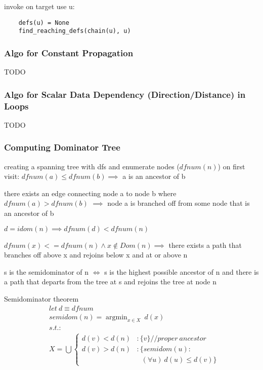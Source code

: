 \documentclass[8pt]{extarticle}
\DeclareMathOperator*{\argmin}{argmin}
\begin{document}
\begin{multicols*}{2}
  invoke on target use u:
  \begin{lstlisting}
    defs(u) = None
    find_reaching_defs(chain(u), u)
  \end{lstlisting}

  \subsubsection{Algo for Constant Propagation\cite{wolfebook}}
  TODO
  
  \subsubsection{Algo for Scalar Data Dependency (Direction/Distance) in Loops\cite{wolfebook}}
  TODO

  \vfill\null
  \columnbreak
    
  \subsubsection{Computing Dominator Tree}

  creating a spanning tree with dfs and enumerate nodes ($dfnum(n)$) on first visit: $dfnum(a) \leq dfnum(b) \implies$ a is an ancestor of b

  there exists an edge connecting node a to node b where $dfnum(a) > dfnum(b)$ $\implies$ node a is branched off from some node that is an ancestor of b

  $d=idom(n) \implies dfnum(d) < dfnum(n)$

  $dfnum(x) <= dfnum(n) \wedge x \notin Dom(n) \implies$ there exists a path that branches off above x and rejoins below x and at or above n

  s is the semidominator of n $\iff$ s is the highest possible ancestor of n and there is a path that departs from the tree at s and rejoins the tree at node n

  Semidominator theorem
  \begin{align*}
  &let\ d \equiv dfnum\\
  &semidom(n) = \argmin_{x \in X}\ d(x)\\
  &s.t.:\\
  &X = \bigcup \begin{cases}
    d(v) < d(n) &: \{v\}//proper\ ancestor\\
    d(v) > d(n) &: \{ semidom(u):\\
                        &\ \ \ (\forall u)\ d(u) \leq d(v) \}
  \end{cases}
  \end{align*}


\end{multicols*}
\end{document}
